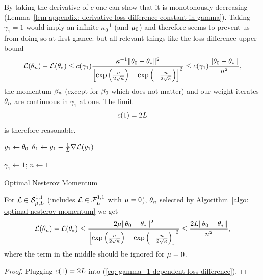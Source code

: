 By taking the derivative of \(c\) one can show that it is monotonously
decreasing (Lemma~\ref{lem-appendix: derivative loss difference constant in
gamma}). Taking \(\gamma_1=1\) would imply an infinite
\(\kappa_0^{-1}\) (and \(\mu_0\)) and therefore seems to prevent us from
doing so at first glance. but all relevant things like the loss difference upper
bound
\begin{align}\label{eq: gamma_1 dependent loss difference}
	\mathcal{L}(\theta_n)-\mathcal{L}(\theta_*)
	\le c(\gamma_1)
	\frac{\kappa^{-1}\|\theta_0-\theta_*\|^2}{\left[
		\exp\left(\frac{n}{2\sqrt{\kappa}}\right)
		-\exp\left(-\frac{n}{2\sqrt{\kappa}}\right)
	\right]^2}
	\le c(\gamma_1)\frac{\|\theta_0-\theta_*\|}{n^2},
\end{align}
the momentum \(\beta_n\) (except for \(\beta_0\) which does not
matter) and our weight iterates \(\theta_n\) are continuous in \(\gamma_1\) at
one. The limit
\begin{align*}
	c(1)=2L
\end{align*}
is therefore reasonable.

\begin{algorithm}
	\(y_1 \leftarrow \theta_0\)\;
	\(\theta_1 \leftarrow y_1 - \tfrac{1}{L}\nabla\mathcal{L}(y_1)\)\;

	\(\gamma_1 \leftarrow 1\); \(n\leftarrow 1\)\;
	\caption{Optimal Nesterov Momentum\label{algo: optimal nesterov momentum}}
\end{algorithm}
\begin{corollary}
	For \(\mathcal{L} \in \mathcal{S}^{1,1}_{{\mu},{L}}\) (includes
	\(\mathcal{L}\in\mathcal{F}^{1,1}_{L}\) with \(\mu=0\)), \(\theta_n\)
	selected by Algorithm~\ref{algo: optimal nesterov momentum}
	we get
	\begin{align*}
		\mathcal{L}(\theta_n)-\mathcal{L}(\theta_*)
		\le
		\frac{2\mu\|\theta_0-\theta_*\|^2}{\left[
			\exp\left(\frac{n}{2\sqrt{\kappa}}\right)
			-\exp\left(-\frac{n}{2\sqrt{\kappa}}\right)
		\right]^2}
		\le\frac{2L\|\theta_0-\theta_*\|}{n^2},
	\end{align*}
	where the term in the middle should be ignored for \(\mu=0\).
\end{corollary}
\begin{proof}
	Plugging \(c(1)=2L\) into (\ref{eq: gamma_1 dependent loss difference}).
\end{proof}



